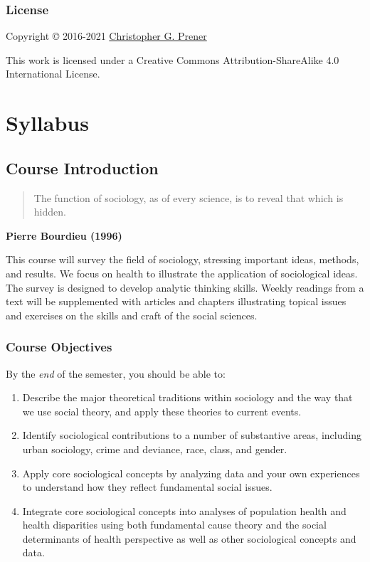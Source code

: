 \documentclass[
]{book}
\providecommand{\tightlist}{%
  \setlength{\itemsep}{0pt}\setlength{\parskip}{0pt}}
\begin{document}
\hypertarget{license}{%
\section*{License}\label{license}}

Copyright © 2016-2021 \href{https://chris-prener.github.io}{Christopher G. Prener}

This work is licensed under a Creative Commons Attribution-ShareAlike 4.0 International License.

\hypertarget{part-syllabus}{%
\part{Syllabus}\label{part-syllabus}}

\hypertarget{course-introduction}{%
\chapter{Course Introduction}\label{course-introduction}}

\begin{quote}
The function of sociology, as of every science, is to reveal that which is hidden.
\end{quote}

\textbf{Pierre Bourdieu (1996)}

This course will survey the field of sociology, stressing important ideas, methods, and results. We focus on health to illustrate the application of sociological ideas. The survey is designed to develop analytic thinking skills. Weekly readings from a text will be supplemented with articles and chapters illustrating topical issues and exercises on the skills and craft of the social sciences.

\hypertarget{course-objectives}{%
\section{Course Objectives}\label{course-objectives}}

By the \emph{end} of the semester, you should be able to:

\begin{enumerate}
\def\labelenumi{\arabic{enumi}.}
\tightlist
\item
  Describe the major theoretical traditions within sociology and the way that we use social theory, and apply these theories to current events.
\item
  Identify sociological contributions to a number of substantive areas, including urban sociology, crime and deviance, race, class, and gender.
\item
  Apply core sociological concepts by analyzing data and your own experiences to understand how they reflect fundamental social issues.
\item
  Integrate core sociological concepts into analyses of population health and health disparities using both fundamental cause theory and the social determinants of health perspective as well as other sociological concepts and data.
\end{enumerate}
\end{document}
